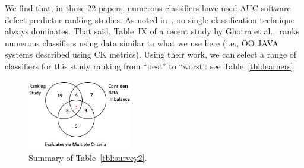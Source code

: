 \documentclass[sigconf,review, anonymous]{acmart}
\theoremstyle{break}
\theoremstyle{break}
\newcommand{\sma}{{\sc SMOTE}}
\newcommand{\smb}{{\sc SMOTUNED}}
\begin{document}
We find that, in those 22 papers,
numerous classifiers have used AUC software defect
predictor ranking studies.  
As
 noted in~\cite{lessmann2008benchmarking, ghotra2015revisiting},  no single classification technique always dominates.  
 That said, Table~IX of a recent study by Ghotra et al.~\cite{ghotra2015revisiting}
 ranks numerous classifiers  using data similar
 to what we use here (i.e., OO JAVA systems described using CK metrics).
 Using their work, we can select
 a range of classifiers  for this study
 ranking from ``best''
 to ``worst': see Table~\ref{tbl:learners}.
 
 \begin{figure}
  \centering
  \captionsetup{justification=centering}
  \includegraphics[width=1.8in]{venn.png}
  \caption{Summary of  Table~\ref{tbl:survey2}.}
\label{fig:s2}
\end{figure}

 


\end{document}
